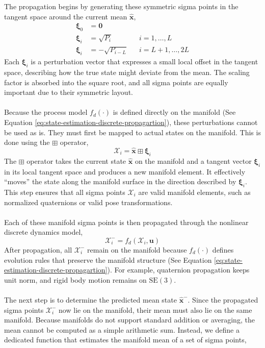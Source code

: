 The propagation begins by generating these symmetric sigma points in the tangent space around the current mean $\hat{\mathbf{x}}$,  
\begin{equation}
    \begin{aligned}
        \boldsymbol{\xi}_0 &= \mathbf{0} \\
        \boldsymbol{\xi}_i &= \sqrt{P_i}              && i = 1, \ldots, L \\
        \boldsymbol{\xi}_i &= -\sqrt{P_{i - L}}       && i = L+1, \ldots, 2L
    \end{aligned}
\end{equation}
Each $\boldsymbol{\xi}_i$ is a perturbation vector that expresses a small local offset in the tangent space, describing how the true state might deviate from the mean. The scaling factor is absorbed into the square root, and all sigma points are equally important due to their symmetric layout.  
\\ \\
Because the process model $f_d(\cdot)$ is defined directly on the manifold (See Equation \ref{eq:state-estimation-discrete-propagartion}), these perturbations cannot be used as is. They must first be mapped to actual states on the manifold. This is done using the $\boxplus$ operator,  
$$
    \mathcal{X}_i = \hat{\mathbf{x}} \boxplus \boldsymbol{\xi}_i
$$
The $\boxplus$ operator takes the current state $\hat{\mathbf{x}}$ on the manifold and a tangent vector $\boldsymbol{\xi}_i$ in its local tangent space and produces a new manifold element. It effectively “moves” the state along the manifold surface in the direction described by $\boldsymbol{\xi}_i$. This step ensures that all sigma points $\mathcal{X}_i$ are valid manifold elements, such as normalized quaternions or valid pose transformations.  
\\ \\
Each of these manifold sigma points is then propagated through the nonlinear discrete dynamics model,  
$$
    \mathcal{X}_i^- = f_d(\mathcal{X}_i, \mathbf{u})
$$
After propagation, all $\mathcal{X}_i^-$ remain on the manifold because $f_d(\cdot)$ defines evolution rules that preserve the manifold structure (See Equation \ref{eq:state-estimation-discrete-propagartion}). For example, quaternion propagation keeps unit norm, and rigid body motion remains on $\mathrm{SE}(3)$.  
\\ \\
The next step is to determine the predicted mean state $\hat{\mathbf{x}}^-$. Since the propagated sigma points $\mathcal{X}_i^-$ now lie on the manifold, their mean must also lie on the same manifold. Because manifolds do not support standard addition or averaging, the mean cannot be computed as a simple arithmetic sum. Instead, we define a dedicated function that estimates the manifold mean of a set of sigma points,  
